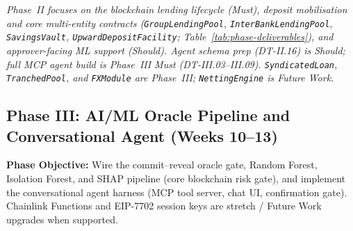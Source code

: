 \documentclass[12pt,a4paper]{report}
\begin{document}
\vspace{2pt}
\noindent\textit{\small Phase~II focuses on the blockchain lending lifecycle (Must), deposit mobilisation and core multi-entity contracts (\texttt{GroupLendingPool}, \texttt{InterBankLendingPool}, \texttt{SavingsVault}, \texttt{UpwardDepositFacility}; Table~\ref{tab:phase-deliverables}), and approver-facing ML support (Should). Agent schema prep (DT-II.16) is Should; full MCP agent build is Phase~III Must (DT-III.03--III.09). \texttt{SyndicatedLoan}, \texttt{TranchedPool}, and \texttt{FXModule} are Phase~III; \texttt{NettingEngine} is Future Work.}


\subsection{Phase III: AI/ML Oracle Pipeline and Conversational Agent (Weeks 10--13)}

\textbf{Phase Objective:} Wire the commit--reveal oracle gate, Random Forest, Isolation Forest, and SHAP pipeline (core blockchain risk gate), and implement the conversational agent harness (MCP tool server, chat UI, confirmation gate). Chainlink Functions and EIP-7702 session keys are stretch / Future Work upgrades when supported.
\end{document}

